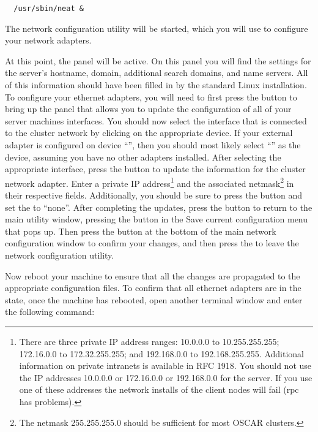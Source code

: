 \begin{verbatim}
  /usr/sbin/neat &
\end{verbatim}
  
The network configuration utility will be started, which you will use
to configure your network adapters.
  
At this point, the  panel will be active. On this panel
you will find the settings for the server's hostname, domain,
additional search domains, and name servers. All of this information
should have been filled in by the standard Linux installation. To
configure your ethernet adapters, you will need to first press the
 button to bring up the panel that allows you to
update the configuration of all of your server machines interfaces.
You should now select the interface that is connected to the cluster
network by clicking on the appropriate device. If your external
adapter is configured on device ``'', then you should most
likely select ``'' as the device, assuming you have no
other adapters installed. After selecting the appropriate interface,
press the  button to update the information for the
cluster network adapter. Enter a private IP address\footnote { There
  are three private IP address ranges: 10.0.0.0 to 10.255.255.255;
  172.16.0.0 to 172.32.255.255; and 192.168.0.0 to 192.168.255.255.
  Additional information on private intranets is available in RFC
  1918.  You should not use the IP addresses 10.0.0.0 or 172.16.0.0 or
  192.168.0.0 for the server.  If you use one of these addresses the
  network installs of the client nodes will fail (rpc has problems).
  } and the associated netmask\footnote{The netmask 255.255.255.0
  should be sufficient for most OSCAR clusters.}  in their respective
fields. Additionally, you should be sure to press the  button and set the  to ``none''.  After completing the updates,
press the  button to return to the main utility window,
pressing the  button in the Save current configuration
menu that pops up.  Then press the  button at the bottom
of the main network configuration window to confirm your changes, and
then press the  to leave the network configuration
utility.
  
Now reboot your machine to ensure that all the changes are propagated
to the appropriate configuration files. To confirm that all ethernet
adapters are in the  state, once the machine has rebooted,
open another terminal window and enter the following command:

